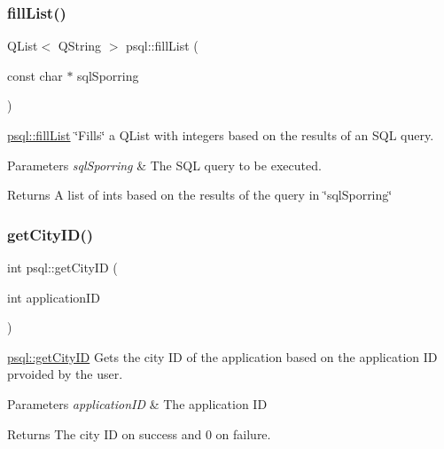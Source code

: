\subsubsection{\texorpdfstring{fill\+List()}{fillList()}}
{\footnotesize\ttfamily Q\+List$<$ Q\+String $>$ psql\+::fill\+List (\begin{DoxyParamCaption}\item[{const char $\ast$}]{sql\+Sporring }\end{DoxyParamCaption})}



\mbox{\hyperlink{classpsql_a2ad41caea89dc5af0b55b12f6394fbf5}{psql\+::fill\+List}} \char`\"{}\+Fills\char`\"{} a Q\+List with integers based on the results of an S\+QL query. 


\begin{DoxyParams}{Parameters}
{\em sql\+Sporring} & The S\+QL query to be executed. \\
\hline
\end{DoxyParams}
\begin{DoxyReturn}{Returns}
A list of ints based on the results of the query in \char`\"{}sql\+Sporring\char`\"{} 
\end{DoxyReturn}
\mbox{\label{classpsql_af3462a12dc106e0ca8df4fa8fcf28436}} 
\subsubsection{\texorpdfstring{get\+City\+I\+D()}{getCityID()}\hspace{0.1cm}{\footnotesize\ttfamily [1/2]}}
{\footnotesize\ttfamily int psql\+::get\+City\+ID (\begin{DoxyParamCaption}\item[{int}]{application\+ID }\end{DoxyParamCaption})}



\mbox{\hyperlink{classpsql_af3462a12dc106e0ca8df4fa8fcf28436}{psql\+::get\+City\+ID}} Gets the city ID of the application based on the application ID prvoided by the user. 


\begin{DoxyParams}{Parameters}
{\em application\+ID} & The application ID \\
\hline
\end{DoxyParams}
\begin{DoxyReturn}{Returns}
The city ID on success and 0 on failure. 
\end{DoxyReturn}
\mbox{\label{classpsql_a0c33b3f48064ba75abaa4b0b58eb1ccd}} 
